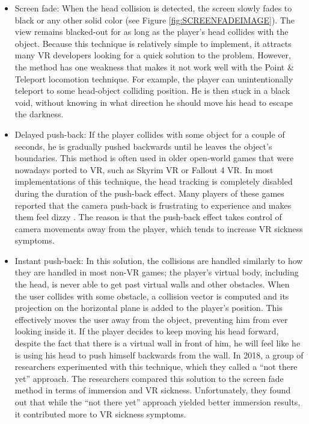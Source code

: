 \begin{itemize}
\item Screen fade: When the head collision is detected, the screen slowly fades to black or any other solid color (see Figure \ref{fig:SCREENFADEIMAGE}). The view remains blacked-out for as long as the player's head collides with the object. Because this technique is relatively simple to implement, it attracts many VR developers looking for a quick solution to the problem. However, the method has one weakness that makes it not work well with the Point \& Teleport locomotion technique. For example, the player can unintentionally teleport to some head-object colliding position. He is then stuck in a black void, without knowing in what direction he should move his head to escape the darkness.

\item Delayed push-back: If the player collides with some object for a couple of seconds, he is gradually pushed backwards until he leaves the object's boundaries. This method is often used in older open-world games that were nowadays ported to VR, such as Skyrim VR or Fallout 4 VR. In most implementations of this technique, the head tracking is completely disabled during the duration of the push-back effect. Many players of these games reported that the camera push-back is frustrating to experience and makes them feel dizzy \cite{redditfallout}\cite{SKYRIMVRPUSHBACK}\cite{PUSHBACKFEEDBACK}. The reason is that the push-back effect takes control of camera movements away from the player, which tends to increase VR sickness symptoms.

\item Instant push-back: In this solution, the collisions are handled similarly to how they are handled in most non-VR games; the player's virtual body, including the head, is never able to get past virtual walls and other obstacles. When the user collides with some obstacle, a collision vector is computed and its projection on the horizontal plane is added to the player's position. This effectively moves the user away from the object, preventing him from ever looking inside it. If the player decides to keep moving his head forward, despite the fact that there is a virtual wall in front of him, he will feel like he is using his head to push himself backwards from the wall. In 2018, a group of researchers \cite{COMPARISONCOLLISION} experimented with this technique, which they called a ``not there yet'' approach. The researchers compared this solution to the screen fade method in terms of immersion and VR sickness. Unfortunately, they found out that while the ``not there yet'' approach yielded better immersion results, it contributed more to VR sickness symptoms.


\end{itemize}
